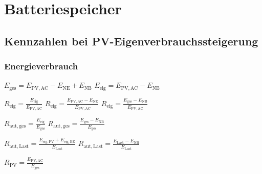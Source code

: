 \columnbreak
\section{Batteriespeicher}
\subsection{Kennzahlen bei PV-Eigenverbrauchssteigerung}

\subsubsection{Energieverbrauch}

\vspace{0.1cm}

$
\boxed{
E_\mathrm{ges} = E_{\mathrm{PV,AC}} - E_{\mathrm{NE}} + E_{\mathrm{NB}} 
}
$
$
\boxed{
E_\mathrm{eig} = E_{\mathrm{PV,AC}} - E_{\mathrm{NE}}
}
$

\vspace{0.1cm}

$
\boxed{
R_\mathrm{eig} = \frac{E_\mathrm{eig}}{E_\mathrm{PV,AC}}
}
$
$
\boxed{
R_\mathrm{eig} = \frac{E_\mathrm{PV,AC} - E_\mathrm{NE}}{E_\mathrm{PV,AC}}
}
$
$
\boxed{
R_\mathrm{eig} = \frac{E_\mathrm{ges} - E_\mathrm{NB}}{E_\mathrm{PV,AC}}
}
$

\vspace{0.1cm}

$
\boxed{
R_\mathrm{aut,ges} = \frac{E_\mathrm{eig}}{E_\mathrm{ges}} 
}
$
$
\boxed{
R_\mathrm{aut,ges} = \frac{E_\mathrm{ges} - E_\mathrm{NB}}{E_\mathrm{ges}}
}
$

\vspace{0.1cm}

$
\boxed{
R_\mathrm{aut,Last} = \frac{E_\mathrm{eig,PV} + E_\mathrm{eig,BE}}{E_\mathrm{Last}}
}
$
$
\boxed{
R_\mathrm{aut,Last} = \frac{E_\mathrm{Last} - E_\mathrm{NB}}{E_\mathrm{Last}}
}
$

\vspace{0.1cm}

$
\boxed{
R_\mathrm{PV} = \frac{E_\mathrm{PV,AC}}{E_\mathrm{ges}}
}
$

\vspace{0.1cm}


